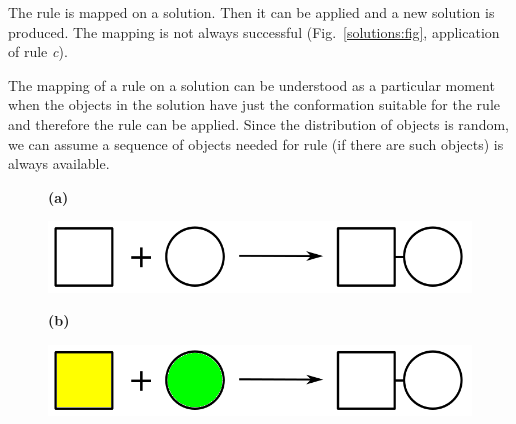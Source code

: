 \documentclass[12pt]{fithesis2}
\begin{document}
The rule is mapped on a solution. Then it can be applied and a new solution is produced. The mapping is not always successful (Fig.~\ref{solutions:fig}, application of rule \emph{c}). %

The mapping of a rule on a solution can be understood as a particular moment when the objects in the solution have just the conformation suitable for the rule and therefore the rule can be applied. Since the distribution of objects is random, we can assume a sequence of objects needed for rule (if there are such objects) is always available.

\begin{figure}[!h]
\begin{center}
\begin{minipage}[l]{0.1\textwidth}
    \textbf{(a)}
  \end{minipage}
  \begin{minipage}[r]{0.6\textwidth}
    {\hspace*{1.3cm}\includegraphics[scale=0.2]{pics/rule_complex}}
\end{minipage}

\begin{minipage}[l]{0.1\textwidth}
    \textbf{(b)}
  \end{minipage}
  \begin{minipage}[r]{0.6\textwidth}
    {\hspace*{1.3cm}\includegraphics[scale=0.2]{pics/rule_complex_mapped}}
\end{minipage}


\end{center}
\end{figure}
\end{document}
